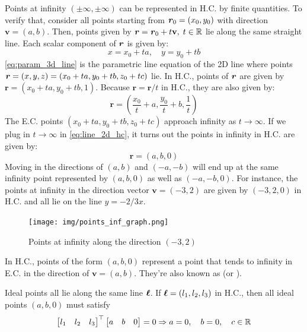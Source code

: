 \documentclass[a4paper]{article}
\begin{document}
Points at infinity $(\pm \infty, \pm \infty)$ can be represented in H.C. by finite quantities. To verify that, consider all points starting from $\textbf{\textit{r}}_0 = (x_0,y_0)$ with direction $\textbf{v} = (a,b)$. Then, points given by $\textbf{\textit{r}} = \textbf{\textit{r}}_0 + t\textbf{v},\; t\in\mathbb{R}$ lie along the same straight line. Each scalar component of $\textbf{\textit{r}}$ is given by:
\begin{equation*}
    x = x_0 + ta, \quad y = y_0 + tb \tag{1}
    \label{eq:param_3d_line}
\end{equation*}
\eqref{eq:param_3d_line} is the parametric line equation of the 2D line where points $\textbf{\textit{r}} = (x,y,z) = (x_0 + ta, y_0 + tb, z_0 + tc)$ lie. In H.C., points of $\textbf{\textit{r}}$ are given by $\textbf{r} = (x_0 + ta, y_0 + tb, 1)$. Because $\textbf{r} = \textbf{r}/t$ in H.C., they are also given by:
\[
\textbf{r} = (\frac{x_0}{t} + a, \frac{y_0}{t} + b, \frac{1}{t}) 
\label{eq:line_2d_hc}
\tag{2}
\]
The E.C. points $(x_0 + ta, y_0 + tb, z_0 + tc)$ approach infinity as $t\rightarrow \infty$. If we plug in $t\rightarrow \infty$ in \eqref{eq:line_2d_hc}, it turns out the points in infinity in H.C. are given by:
\[
\textbf{r} = (a, b , 0) 
\]
 Moving in the directions of $(a,b)$ and $(-a, -b)$ will end up at the same infinity point represented by $(a,b,0)$ as well as $(-a, -b, 0)$. For instance, the points at infinity in the direction vector $\textbf{v}=(-3,2)$ are given by $(-3,2,0)$ in H.C. and all lie on the line $y=-2/3x$.
 \begin{figure}[H]
     \centering
     \texttt{[image: img/points\_inf\_graph.png]}
     \caption{Points at infinity along the direction $(-3,2)$}
 \end{figure}
\begin{corollary}
In H.C., points of the form $(a, b, 0)$ represent a point that tends to infinity in E.C. in the direction of $\textbf{v} = (a,b)$. They're also known as  (or ).
\end{corollary}
Ideal points all lie along the same line $\boldsymbol{\ell}$. If $\boldsymbol{\ell} = (l_1,l_2,l_3)$ in H.C., then all ideal points $(a,b,0)$ must satisfy
\begin{align*}
    \begin{bmatrix}l_1 & l_2 & l_3\end{bmatrix}^{\top} \begin{bmatrix}a & b & 0\end{bmatrix} = 0 \Rightarrow
    a = 0, \quad b = 0,\quad c \in \mathbb{R}
\end{align*}
\end{document}
